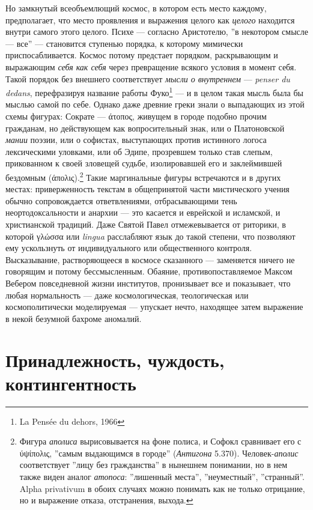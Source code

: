 \documentclass[12pt]{book}
\begin{document}
Но замкнутый всеобъемлющий космос, в котором есть место каждому, предполагает, что место проявления и выражения целого как \textit{целого} находится внутри самого этого целого. Психе --- согласно Аристотелю, ''в некотором смысле --- все'' --- становится ступенью порядка, к которому мимически приспосабливается. Космос потому предстает порядком, раскрывающим и выражающим \textit{себя как себя} через превращение всякого условия в момент себя. Такой порядок без внешнего соответствует \textit{мысли о внутреннем} --- \textit{penser du dedans}, перефразируя название работы Фуко\footnote{La Pensée du dehors, 1966} --- и в целом такая мысль была бы мыслью самой по себе. Однако даже древние греки знали о выпадающих из этой схемы фигурах: Сократе --- άτοπος, живущем в городе подобно прочим гражданам, но действующем как вопросительный знак, или о Платоновской \textit{мании} поэзии, или о софистах, выступающих против истинного логоса лексическими уловками, или об Эдипе, прозревшем только став слепым, прикованном к своей зловещей судьбе, изолировавшей его и заклеймившей бездомным (άπολις).\footnote{Фигура \textit{аполиса} вырисовывается на фоне полиса, и Софокл сравнивает его с ύψίπολις, ''самым выдающимся в городе'' (\textit{Антигона} 5.370). Человек-\textit{аполис} соответствует ''лицу без гражданства'' в нынешнем понимании, но в нем также виден аналог \textit{атопоса}: ''лишенный места'', ''неуместный'', ''странный''. Alpha privativum в обоих случаях можно понимать как не только отрицание, но и выражение отказа, отстранения, выхода.} Такие маргинальные фигуры встречаются и в других местах: приверженность текстам в общепринятой части мистического учения обычно сопровождается ответвлениями, отбрасывающими тень неортодоксальности и анархии --- это касается и еврейской и исламской, и христианской традиций. Даже Святой Павел отмежевывается от риторики, в которой γλώσσα или \textit{lingua} расслабляют язык до такой степени, что позволяют ему ускользнуть от индивидуального или общественного контроля. Высказывание, растворяющееся в космосе сказанного --- заменяется ничего не говорящим и потому бессмысленным. Обаяние, противопоставляемое Максом Вебером повседневной жизни институтов, пронизывает все и показывает, что любая нормальность --- даже космологическая, теологическая или космополитически моделируемая --- упускает нечто, находящее затем выражение в некой безумной бахроме аномалий.

\section{Принадлежность, чуждость, контингентность}
\end{document}
